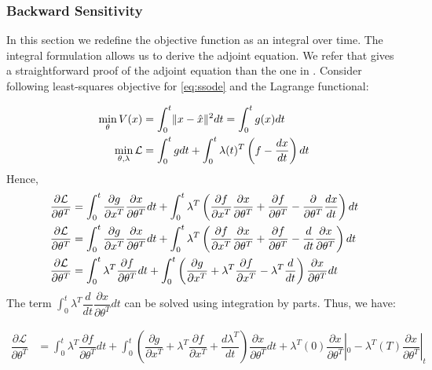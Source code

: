 \documentclass[fontsize=11pt]{article}
\newcommand{\norm}[1]{\lVert #1 \rVert}
\theoremstyle{definition}
\begin{document}
\subsubsection{Backward Sensitivity}

In this section we redefine the objective function as an integral over time.
The integral formulation allows us to derive the adjoint equation. We refer \cite{sengupta:friston:penny:2014} 
that gives a straightforward proof of the adjoint equation than the one in
\cite{chen:rubanova:bettencourt:duvenaud:2018}.
Consider following least-squares objective for \cref{eq:ssode} and the Lagrange functional:

\begin{align}
    \min\limits_{\theta}V(x) &= \int_0^t \norm{x - \hat{x}}^2 dt = \int_0^t g(x)dt \notag \\
    \min\limits_{\theta, \lambda}\mathcal{L} &= \int_0^t g dt + \int_0^t \lambda(t)^T \left(f - \dfrac{dx}{dt}\right) dt
\end{align}
Hence,
\begin{align}
    \dfrac{\partial \mathcal{L}}{\partial \theta^T} &= \int_0^t \dfrac{\partial g}{\partial x^T} \dfrac{\partial x}{\partial \theta^T} dt + 
    \int_0^t \lambda^T \left(\dfrac{\partial f}{\partial x^T} \dfrac{\partial x}{\partial \theta^T} + \dfrac{\partial f}{\partial \theta^T} - \dfrac{\partial}{\partial \theta^T}\dfrac{dx}{dt}\right) dt \notag \\
    \dfrac{\partial \mathcal{L}}{\partial \theta^T} &= \int_0^t \dfrac{\partial g}{\partial x^T} \dfrac{\partial x}{\partial \theta^T} dt + 
    \int_0^t \lambda^T \left(\dfrac{\partial f}{\partial x^T} \dfrac{\partial x}{\partial \theta^T} + \dfrac{\partial f}{\partial \theta^T} - \dfrac{d}{dt}\dfrac{\partial x}{\partial \theta^T}\right) dt \notag \\
    \dfrac{\partial \mathcal{L}}{\partial \theta^T} &= \int_0^t \lambda^T \dfrac{\partial f}{\partial \theta^T} dt + \int_0^t \left(\dfrac{\partial g}{\partial x^T}
    + \lambda^T \dfrac{\partial f}{\partial x^T} - \lambda^T\dfrac{d}{dt}\right)\dfrac{\partial x}{\partial \theta^T} dt
\end{align}
The term $\int_0^t{\lambda^T \dfrac{d}{dt} \dfrac{\partial x}{\partial \theta^T}dt}$ 
can be solved using integration by parts. Thus, we have:

\begin{align}
    \dfrac{\partial \mathcal{L}}{\partial \theta^T} &= \int_0^t \lambda^T \dfrac{\partial f}{\partial \theta^T} dt + \int_0^t \left(\dfrac{\partial g}{\partial x^T}
    + \lambda^T \dfrac{\partial f}{\partial x^T} + \dfrac{d\lambda^T}{dt}\right)\dfrac{\partial x}{\partial \theta^T} dt + \lambda^T(0)\dfrac{\partial x}{\partial \theta^T}|_0
    - \lambda^T(T)\dfrac{\partial x}{\partial \theta^T}|_t
    \label{eq:adjoint}
\end{align}
\end{document}
